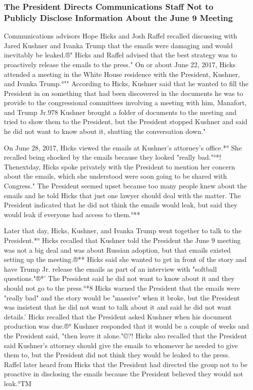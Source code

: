 \subsubsection{The President Directs Communications Staff Not to Publicly Disclose Information About the June 9 Meeting}

Communications advisors Hope Hicks and Josh Raffel recalled discussing with Jared Kushner and Ivanka Trump that the emails were damaging and would inevitably be leaked.®"
Hicks and Raffel advised that the best strategy was to proactively release the emails to the press."
On or about June 22, 2017, Hicks attended a meeting in the White House residence with the President, Kushner, and Ivanka Trump.°""
According to Hicks, Kushner said that he wanted to fill the President in on something that had been discovered in the documents he was to provide to the congressional committees involving a meeting with him, Manafort, and Trump Jr.978
Kushner brought a folder of documents to the meeting and tried to show them to the President, but the President stopped Kushner and said he did not want to know about it, shutting the conversation down."

On June 28, 2017, Hicks viewed the emails at Kushner's attorney's office.*°
She recalled being shocked by the emails because they looked "really bad."°*!
Thenextday, Hicks spoke privately with the President to mention her concern about the emails, which she understood were soon going to be shared with Congress."
The President seemed upset because too many people knew about the emails and he told Hicks that just one lawyer should deal with the matter.
The President indicated that he did not think the emails would leak, but said they would leak if everyone had access to them.°**

Later that day, Hicks, Kushner, and Ivanka Trump went together to talk to the President.*°
Hicks recalled that Kushner told the President the June 9 meeting was not a big deal and was about Russian adoption, but that emails existed setting up the meeting.®**
Hicks said she wanted to get in front of the story and have Trump Jr. release the emails as part of an interview with "softball questions."®*'
The President said he did not want to know about it and they should not go to the press.°*8
Hicks warned the President that the emails were "really bad" and the story would be "massive" when it broke, but the President was insistent that he did not want to talk about it and said he did not want details.'
Hicks recalled that the President asked Kushner when his document production was due.®°
Kushner responded that it would be a couple of weeks and the President said, "then leave it alone."©?!
Hicks also recalled that the President said Kushner's attorney should give the emails to whomever he needed to give them to, but the President did not think they would be leaked to the press.
Raffel later heard from Hicks that the President had directed the group not to be proactive in disclosing the emails because the President believed they would not leak.°TM

